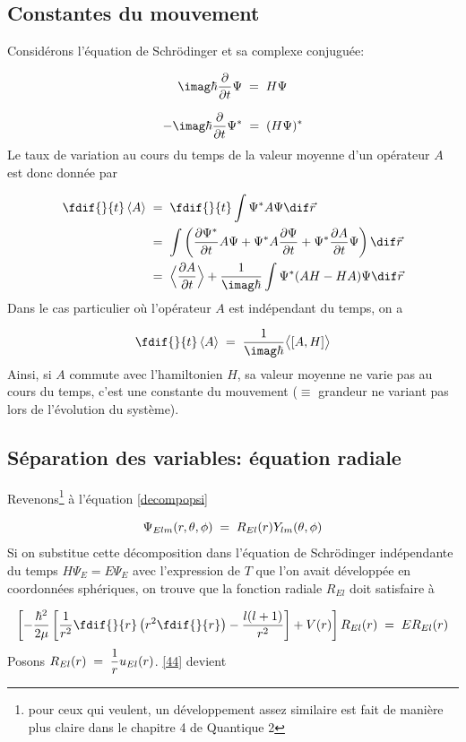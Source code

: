 \subsection{Constantes du mouvement}
Considérons l'équation de Schrödinger et sa complexe conjuguée:

\[
    \imag \hbar \dfrac{\partial}{\partial t} \Psi \eq H \Psi
\]

\[
    -\imag \hbar \dfrac{\partial}{\partial t} \Psi ^{*}\eq (H \Psi)^{*}
\]
Le taux de variation au cours du temps de la valeur moyenne d'un opérateur $A$ est donc donnée par

\begin{align*}
    \fdif{}{t}  \left<A\right>&\eq\fdif{}{t} \int \Psi^{*} A \Psi \dif\vec{r} \\
    &\eq \int\left(\dfrac{\partial\Psi^{*}}{\partial t}A \Psi + \Psi^{*} A \dfrac{\partial \Psi }{\partial t } + \Psi^{*} \dfrac{\partial A}{\partial t}\Psi \right) \dif\vec{r}\\
    &\eq \Big< \dfrac{\partial A}{\partial t} \Big> +\dfrac{1}{\imag \hbar} \int \Psi^{*} (AH-HA)\Psi \dif\vec{r}
\end{align*}
Dans le cas particulier où l'opérateur $A$ est indépendant du temps, on a


\[
  \fdif{}{t}\left<A\right>\eq \dfrac{1}{\imag\hbar}\big<[A,H]\big>
\]
Ainsi, si $A$ commute avec l'hamiltonien $H$, sa valeur moyenne ne varie pas au cours du temps, c'est une constante du mouvement ($\equiv$ grandeur ne variant pas lors de l'évolution du système).


\subsection{Séparation des variables: équation radiale}
Revenons\footnote{pour ceux qui veulent, un développement assez similaire est fait de
manière plus claire dans le chapitre 4 de Quantique 2} à l'équation \eqref{decompopsi}

\[
    \Psi_{Elm}(r, \theta, \phi)\; = \; R_{El}(r)Y_{lm}(\theta, \phi)
\]
Si on substitue cette décomposition dans l'équation de Schrödinger indépendante du temps $H\Psi_E=E\Psi_E$ avec l'expression de $T$ que l'on avait développée en coordonnées sphériques, on trouve que la fonction radiale $R_{El}$ doit satisfaire à

\begin{equation}
    \left[-\dfrac{\hbar^2}{2\mu}\left[\dfrac{1}{r^2}\fdif{}{r}\left(r^2\fdif{}{r}\right) - \dfrac{l(l+1)}{r^2}\right]+V(r)\right]R_{El}(r)\eq ER_{El}(r)
    \label{44}
\end{equation}
Posons $R_{El}(r)\; = \; \dfrac{1}{r}u_{El}(r)$. \eqref{44} devient


